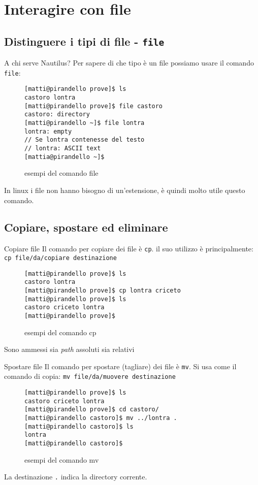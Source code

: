 \section{Interagire con file}

  \subsection{Distinguere i tipi di file - \texttt{file}}
\begin{frame}[fragile]{A chi serve Nautilus?}
  Per sapere di che tipo è un file possiamo usare il comando \texttt{file}:
  \begin{figure}
    \begin{lstlisting}[basicstyle=\footnotesize]
[matti@pirandello prove]$ ls 
castoro lontra
[matti@pirandello prove]$ file castoro 
castoro: directory
[matti@pirandello ~]$ file lontra
lontra: empty
// Se lontra contenesse del testo
// lontra: ASCII text
[mattia@pirandello ~]$
    \end{lstlisting}
    \caption{esempi del comando file}
  \end{figure}
  In linux i file non hanno bisogno di un'estensione, è quindi molto utile 
  questo comando.
\end{frame}

\subsection{Copiare, spostare ed eliminare}
\begin{frame}[fragile]{Copiare file}
  Il comando per copiare dei file è \texttt{cp}. il suo utilizzo è 
  principalmente: \texttt{cp file/da/copiare destinazione}
  \begin{figure}
    \begin{lstlisting}[basicstyle=\small]
[matti@pirandello prove]$ ls 
castoro lontra
[matti@pirandello prove]$ cp lontra criceto 
[matti@pirandello prove]$ ls 
castoro criceto lontra
[matti@pirandello prove]$
    \end{lstlisting}
    \caption{esempi del comando cp}
  \end{figure}
  Sono ammessi sia \textit{path} assoluti sia relativi
\end{frame}

\begin{frame}[fragile]{Spostare file}
  Il comando per spostare (tagliare) dei file è \texttt{mv}. Si usa come il 
  comando di copia: \texttt{mv file/da/muovere 
  destinazione}
  \begin{figure}
    \begin{lstlisting}[basicstyle=\small]
[matti@pirandello prove]$ ls 
castoro criceto lontra
[matti@pirandello prove]$ cd castoro/ 
[matti@pirandello castoro]$ mv ../lontra .
[matti@pirandello castoro]$ ls
lontra
[matti@pirandello castoro]$
    \end{lstlisting}
    \caption{esempi del comando mv}
  \end{figure}
  La destinazione \texttt{.} indica la directory corrente.
\end{frame}

